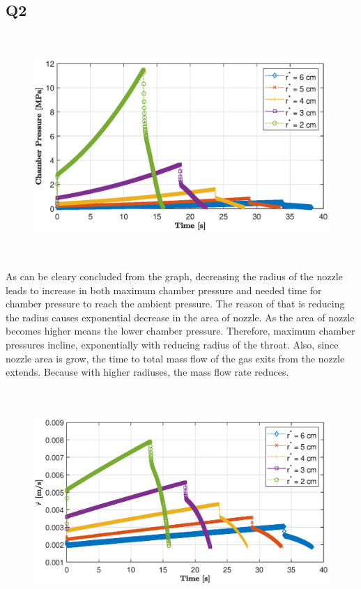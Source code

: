 \documentclass[letterpaper,12pt]{article}
\begin{document}
\subsection{Q2}
\begin{figure}[!h]
	\centering
	\includegraphics[height = 8.5cm]{graphs/q2_pc.eps}
	\label{fig:q2p_cp}
\end{figure}
As can be cleary concluded from the graph, decreasing the radius of the nozzle leads to increase in both maximum chamber pressure
and needed time for chamber pressure to reach the ambient pressure. The reason of that is reducing the radius causes exponential
decrease in the area of nozzle. As the area of nozzle becomes higher means the lower chamber pressure. Therefore, maximum chamber
pressures incline, exponentially with reducing radius of the throat. Also, since nozzle area is grow, the time to total mass flow 
of the gas exits from the nozzle extends. Because with higher radiuses, the mass flow rate reduces.
\newpage
\begin{figure}[!h]
	\centering
	\includegraphics[height = 8.5cm]{graphs/q2_rdot.eps}
	\label{fig:q2r_dot}
\end{figure}
\end{document}

